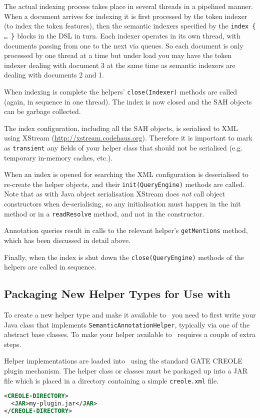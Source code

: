 The actual indexing process takes place in several threads in a pipelined
manner.  When a document arrives for indexing it is first processed by the
token indexer (to index the token features), then the semantic indexers
specified by the {\tt index \{ \ldots\ \}} blocks in the DSL in turn.  Each
indexer operates in its own thread, with documents passing from one to the next
via queues.  So each document is only processed by one thread at a time but
under load you may have the token indexer dealing with document 3 at the same
time as semantic indexers are dealing with documents 2 and 1.

When indexing is complete the helpers' {\tt close(Indexer)} methods are called
(again, in sequence in one thread).  The index is now closed and the SAH
objects can be garbage collected.

The index configuration, including all the SAH objects, is serialised to XML
using XStream (\url{http://xstream.codehaus.org}). Therefore it is important to
mark as \lstinline!transient! any fields of your helper class that should not be
serialised (e.g. temporary in-memory caches, etc.).

When an index is opened for searching the XML configuration is deserialised to
re-create the helper objects, and their {\tt init(QueryEngine)} methods are
called.  Note that as with Java object serialisation XStream does {\em not}
call object constructors when de-serialising, so any initialisation must happen
in the init method or in a {\tt readResolve} method, and not in the
constructor.

Annotation queries result in calls to the relevant helper's {\tt getMentions}
method, which has been discussed in detail above.

Finally, when the index is shut down the {\tt close(QueryEngine)} methods of
the helpers are called in sequence.

\subsection{Packaging New Helper Types for Use with \Mimir}
\label{sec:extend-package-plugins}

To create a new helper type and make it available to \Mimir\ you need to first
write your Java class that implements {\tt SemanticAnnotationHelper}, typically
via one of the abstract base classes.  To make your helper available to \Mimir\
requires a couple of extra steps.

Helper implementations are loaded into \Mimir\ using the standard GATE CREOLE
plugin mechanism.  The helper class or classes must be packaged up into a JAR
file which is placed in a directory containing a simple {\tt creole.xml} file.
\begin{lstlisting}[language=XML]
<CREOLE-DIRECTORY>
  <JAR>my-plugin.jar</JAR>
</CREOLE-DIRECTORY>
\end{lstlisting}

